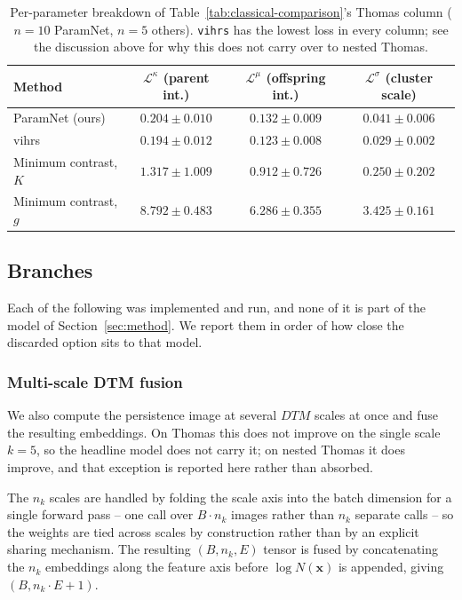 \documentclass[11pt,letterpaper]{article}
\newcommand{\1}{\mathds{1}}
\newcommand{\pc}{\mathbf{x}}
\theoremstyle{plain}
\theoremstyle{definitioncolon}
\begin{document}
\begin{table}[tbp]
\centering
\small
\begin{tabular}{lccc}
\toprule
Method & $\mathcal{L}^\kappa$ (parent int.) & $\mathcal{L}^\mu$ (offspring int.) & $\mathcal{L}^\sigma$ (cluster scale) \\
\midrule
ParamNet (ours)        & $0.204 \pm 0.010$ & $0.132 \pm 0.009$ & $0.041 \pm 0.006$ \\
vihrs                  & $0.194 \pm 0.012$ & $0.123 \pm 0.008$ & $0.029 \pm 0.002$ \\
Minimum contrast, $K$  & $1.317 \pm 1.009$ & $0.912 \pm 0.726$ & $0.250 \pm 0.202$ \\
Minimum contrast, $g$  & $8.792 \pm 0.483$ & $6.286 \pm 0.355$ & $3.425 \pm 0.161$ \\
\bottomrule
\end{tabular}
\caption{Per-parameter breakdown of Table~\ref{tab:classical-comparison}'s
Thomas column ($n=10$ ParamNet, $n=5$ others). \texttt{vihrs} has the lowest
loss in every column; see the discussion above for why this does not carry
over to nested Thomas.}
\label{tab:classical-per-param}
\end{table}

\subsection{Branches}
\label{ssec:branches}

Each of the following was implemented and run, and none of it is part of the
model of Section~\ref{sec:method}. We report them in order of how close the
discarded option sits to that model.

\subsubsection{Multi-scale DTM fusion}
\label{ssec:branch-multiscale}

We also compute the persistence image at several $DTM$ scales at once and fuse
the resulting embeddings. On Thomas this does not improve on the single scale
$k=5$, so the headline model does not carry it; on nested Thomas it does
improve, and that exception is reported here rather than absorbed.

The $n_k$ scales are handled by folding the scale axis into the batch dimension
for a single forward pass -- one call over $B \cdot n_k$ images rather than
$n_k$ separate calls -- so the weights are tied across scales by construction
rather than by an explicit sharing mechanism. The resulting $(B, n_k, E)$ tensor
is fused by concatenating the $n_k$ embeddings along the feature axis before
$\log N(\pc)$ is appended, giving $(B, n_k \cdot E + 1)$.
\end{document}
